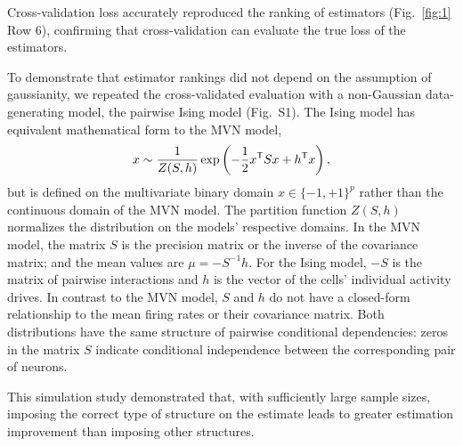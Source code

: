 Cross-validation loss accurately reproduced the ranking of estimators (Fig.~\ref{fig:1} Row 6), confirming that cross-validation can evaluate the true loss of the estimators. 

To demonstrate that estimator rankings did not depend on the assumption of gaussianity, we repeated the cross-validated evaluation with a non-Gaussian data-generating model, the pairwise Ising model (Fig.~S1).   The Ising model \cite{Hertz:2011} has equivalent mathematical form to the MVN model,
\begin{equation}
    x\sim \frac 1 {Z(S,h)} \exp\left(-\frac 1 2 x^{\sf T} S x + h^{\sf T} x \right),
\end{equation}
but is defined on the multivariate binary domain $x\in\{-1,+1\}^p$ rather than the continuous domain of the MVN model. 
The partition function $Z(S,h)$ normalizes the distribution on the models' respective domains. 
In the MVN model, the matrix $S$ is the precision matrix or the inverse of the covariance matrix; and the mean values are $\mu=-S^{-1}h$.  
For the Ising model, $-S$ is the matrix of pairwise interactions and $h$ is the vector of the cells' individual activity drives. In contrast to the MVN model,  $S$ and $h$ do not have a closed-form relationship to the mean firing rates or their covariance matrix. 
Both distributions have the same structure of pairwise conditional dependencies: zeros in the matrix $S$ indicate conditional independence between the corresponding pair of neurons.

This simulation study demonstrated that, with sufficiently large sample sizes, imposing the correct type of structure on the estimate leads to greater estimation improvement than imposing other structures.

